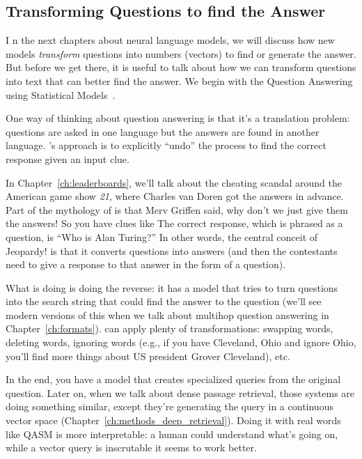 \subsection{Transforming Questions to find the Answer}
I
n the next chapters about neural language models, we will discuss how new
models \emph{transform} questions into numbers (vectors) to find or generate
the answer.
%
But before we get there, it is useful to talk about how we can transform
questions into text that can better find the answer.
%
We begin with the Question Answering using Statistical Models~\citep[]{radev-01}.

One way of thinking about question answering is that it's a translation
problem: questions are asked in one language but the answers are found in
another language.
%
's approach is to explicitly ``undo'' the process to find the
correct response given an input clue.

In Chapter~\ref{ch:leaderboards}, we'll talk about the cheating scandal
around the American game show \textit{21}, where Charles van Doren got
the answers in advance.
%
Part of the mythology of \jeopardy{} is that Merv Griffen said, why
don’t we just give them the answers!
%
So you have clues like 
%
The correct response, which is phrased as a question, is
``Who is Alan Turing?''
%
In other words, the central conceit of Jeopardy! is that it converts questions
into answers (and then the contestants need to give a response to that answer
in the form of a question).

What  is doing is doing the reverse: it has a model that
tries to turn questions into the search string that could find the
answer to the question (we'll see modern versions of this when we talk about
multihop question answering in Chapter~\ref{ch:formats}).
%
 can apply plenty of transformations: swapping words,
deleting words, ignoring words (e.g., if you have Cleveland, Ohio and ignore
Ohio, you’ll find more things about US president Grover Cleveland), etc.


In the end, you have a model that creates specialized queries from the
original question.
%
Later on, when we talk about dense passage retrieval, those systems are doing
something similar, except they’re generating the query in a continuous vector
space (Chapter~\ref{ch:methods_deep_retrieval}).
%
Doing it with real words like QASM is more interpretable: a human could
understand what’s going on, while a vector query is inscrutable it seems to
work better.

